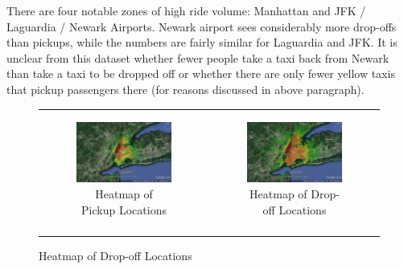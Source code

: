 \documentclass{article}
\begin{document}
There are four notable zones of high ride volume: Manhattan and JFK / Laguardia / Newark Airports. Newark airport sees considerably more drop-offs than pickups, while the numbers are fairly similar for Laguardia and JFK. It is unclear from this dataset whether fewer people take a taxi back from Newark than take a taxi to be dropped off or whether there are only fewer yellow taxis that pickup passengers there (for reasons discussed in above paragraph). 

\begin{figure}

\begin{tabular}{cc}

\begin{subfigure}{.5\linewidth}
  \centering
  \includegraphics[width=.8\linewidth]{pickup_overhead.jpg}
  \caption{Heatmap of Pickup Locations}
  \label{sub:pu_oh}
\end{subfigure} & 
\begin{subfigure}{.5\linewidth}
  \centering
  \includegraphics[width=.8\linewidth]{dropoff_overhead.jpg}
  \caption{Heatmap of Drop-off Locations}
  \label{sub:do_oh}
\end{subfigure} \\\\

\end{tabular}
\end{figure}
\end{document}
